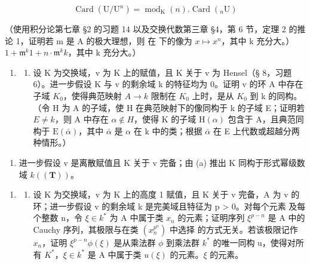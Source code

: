 \[
\operatorname{Card} (\mathrm{U} / \mathrm{U} ^ {n}) = \operatorname{mod} _ {\mathrm{K}} (n). \operatorname{Card} (_ {n} \mathrm{U})
\]

（使用积分论第七章 §2 的习题 14 以及交换代数第三章 §4，第 6 节，定理 2 的推论 1，证明若 m 是 A 的极大理想，则  在  下的像为 \(x \mapsto x^n\)，其中 k 充分大。）\(1 + \mathfrak{m}^k\)\(1 + n \cdot \mathfrak{m}^k\)\(k\)，其中 k 充分大。）

\begin{enumerate}
\def\labelenumi{\arabic{enumi}.}
\setcounter{enumi}{3}
\tightlist
\item
  \begin{enumerate}
  \def\labelenumii{(\alph{enumii})}
  \tightlist
  \item
    设 K 为交换域，v 为 K 上的赋值，且 K 关于 v 为 Hensel（§ 8，习题 6）。进一步假设 K 与 v 的剩余域 k 的特征均为 0。证明 v 的环 A 中存在子域 \(K_{0}\)，使得典范映射 \(A \rightarrow k\) 限制在 \(K_{0}\) 上时，是从 \(K_{0}\) 到 k 的同构。（令 H 为 A 的子域，使 H 在典范映射下的像同构于 k 的子域 E；证明若 \(E \neq k\)，则 A 中存在 \(\alpha \notin H\)，使得 K 的子域 \(\mathrm{H}(\alpha)\) 包含于 A，且典范同构于 \(\mathrm{E}(\bar{\alpha})\)，其中 \(\bar{\alpha}\) 是 \(\alpha\) 在 k 中的类；根据 \(\bar{\alpha}\) 在 E 上代数或超越分两种情形。）
  \end{enumerate}
\end{enumerate}

\begin{enumerate}
\def\labelenumi{(\alph{enumi})}
\setcounter{enumi}{1}
\tightlist
\item
  进一步假设 v 是离散赋值且 K 关于 v 完备；由 (a) 推出 K 同构于形式幂级数域 \(k((\mathbf{T}))\)。
\end{enumerate}

\begin{enumerate}
\def\labelenumi{\arabic{enumi}.}
\setcounter{enumi}{4}
\tightlist
\item
  \begin{enumerate}
  \def\labelenumii{(\alph{enumii})}
  \tightlist
  \item
    设 K 为交换域，v 为 K 上的高度 1 赋值，且 K 关于 v 完备，A 为 v 的环；进一步假设 v 的剩余域 k 是完美域且特征为 p \textgreater{} 0。对每个元素  及每个整数 n，令 \(\xi \in k^{*}\) 为 A 中属于类 \(x_{n}\) 的元素；证明序列 \(\xi^{p-n}\) 是 A 中的 Cauchy 序列，其极限与在类 \((x_{n}^{p^{n}})\) 中选择  的方式无关。若该极限记作 \(x_{n}\)，证明 \(\xi^{p-n}\)\(\phi(\xi)\) 是从乘法群 \(\phi\) 到乘法群 \(k^{*}\) 的唯一同构 u，使得对所有 \(K^{*}\)，\(\xi \in k^{*}\) 是 A 中属于类 \(u(\xi)\) 的元素。\(\xi\) 的元素。
  \end{enumerate}
\end{enumerate}

